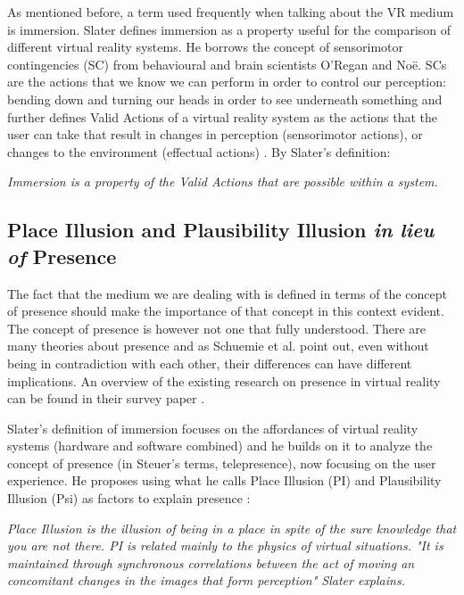As mentioned before, a term used frequently when talking about the VR medium is immersion. Slater defines immersion as a property useful for the comparison of different virtual reality systems. He borrows the concept of sensorimotor contingencies (SC) from behavioural and brain scientists O'Regan and Noë. SCs are the actions that we know we can perform in order to control our perception: bending down and turning our heads in order to see underneath something and further defines Valid Actions of a virtual reality system as the actions that the user can take that result in changes in perception (sensorimotor actions), or changes to the environment (effectual actions) \parencite{Slater2009}. By Slater's definition:

\begin{displayquote}
\textit{Immersion is a property of the Valid Actions that are possible within a system.}
\end{displayquote}

\subsection{Place Illusion and Plausibility Illusion \textit{in lieu of} Presence}
\label{subsec:PIandPsi}

The fact that the medium we are dealing with is defined in terms of the concept of presence should make the importance of that concept in this context evident. The concept of presence is however not one that fully understood. There are many theories about presence and as Schuemie et al. point out, even without being in contradiction with each other, their differences can have different implications. An overview of the existing research on presence in virtual reality can be found in their survey paper \parencite{Schuemie2001}.

Slater's definition of immersion focuses on the affordances \parencite{Norman} of virtual reality systems (hardware and software combined) and he builds on it to analyze the concept of presence (in Steuer's terms, telepresence), now focusing on the user experience. He proposes using what he calls Place Illusion (PI) and Plausibility Illusion (Psi) as factors to explain presence \parencite{Slater2009}:

\begin{displayquote}
\textit{Place Illusion is the illusion of being in a place in spite of the sure knowledge that you are not there. PI is related mainly to the physics of virtual situations. "It is maintained through synchronous correlations between the act of moving an concomitant changes in the images that form perception" Slater explains.}
\end{displayquote}

